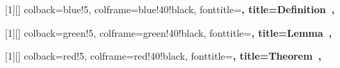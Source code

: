 \usepackage{tcolorbox}
\usepackage{hyperref}
\usepackage{geometry}
\usepackage{tikz}
\usepackage{pgfplots}
\usepackage{booktabs}
\usepackage{amssymb}
\usepackage{xparse}
\usepackage{eucal}
\usepackage{dsfont}
\usepackage{enumitem}


\pgfplotsset{compat=1.18}

[1][]{%
  colback=blue!5,
  colframe=blue!40!black,
  fonttitle=\bfseries,
  title={Definition~\thetcbcounter{}},
}

[1][]{%
  colback=green!5,
  colframe=green!40!black,
  fonttitle=\bfseries,
  title={Lemma~\thetcbcounter{}},
}

[1][]{%
  colback=red!5,
  colframe=red!40!black,
  fonttitle=\bfseries,
  title={Theorem~\thetcbcounter{}},
}

\newtheorem{corollary}[subsection]{Corollary}
\newtheorem{exercise}[subsection]{Exercise}

\newtheorem*{remark}{Remark}